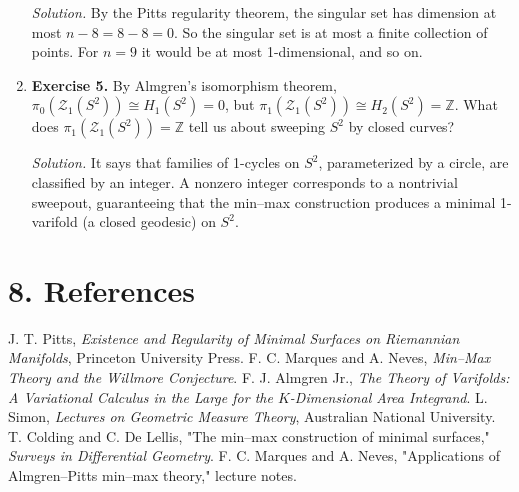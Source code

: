 \begin{enumerate}[leftmargin=*,itemsep=0.9em]
\emph{Solution.} By the Pitts regularity theorem, the singular set has dimension at most $n-8=8-8=0$. So the singular set is at most a finite collection of points. For $n=9$ it would be at most 1-dimensional, and so on.

\item \textbf{Exercise 5.} By Almgren's isomorphism theorem, $\pi_0(\mathcal{Z}_1(S^2))\cong H_1(S^2)=0$, but $\pi_1(\mathcal{Z}_1(S^2))\cong H_2(S^2)=\mathbb{Z}$. What does $\pi_1(\mathcal{Z}_1(S^2))=\mathbb{Z}$ tell us about sweeping $S^2$ by closed curves?

\emph{Solution.} It says that families of 1-cycles on $S^2$, parameterized by a circle, are classified by an integer. A nonzero integer corresponds to a nontrivial sweepout, guaranteeing that the min--max construction produces a minimal 1-varifold (a closed geodesic) on $S^2$.

\end{enumerate}
\section*{8. References}
\begin{thebibliography}{99}
 J. T. Pitts, \emph{Existence and Regularity of Minimal Surfaces on Riemannian Manifolds}, Princeton University Press.
 F. C. Marques and A. Neves, \emph{Min--Max Theory and the Willmore Conjecture}.
 F. J. Almgren Jr., \emph{The Theory of Varifolds: A Variational Calculus in the Large for the $K$-Dimensional Area Integrand}.
 L. Simon, \emph{Lectures on Geometric Measure Theory}, Australian National University.
 T. Colding and C. De Lellis, "The min--max construction of minimal surfaces," \emph{Surveys in Differential Geometry}.
 F. C. Marques and A. Neves, "Applications of Almgren--Pitts min--max theory," lecture notes.
\end{thebibliography}
